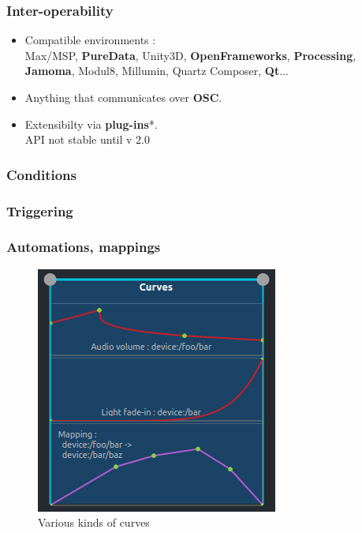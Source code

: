 \documentclass{beamer}
\begin{document}
    \begin{frame}
        \frametitle{Inter-operability}
        \Large
        \begin{itemize}
        	\item Compatible environments :\\
	        	 Max/MSP, \textbf{PureData}, Unity3D, \textbf{OpenFrameworks}, \textbf{Processing}, \textbf{Jamoma}, Modul8, Millumin, Quartz Composer, \textbf{Qt}... 
	        \item Anything that communicates over \textbf{OSC}.
	        \item Extensibilty via \textbf{plug-ins}*. \\ {\small *API not stable until v 2.0}
        \end{itemize}
        
    \end{frame}
    
    
    \begin{frame}
        \frametitle{Conditions}
        \begin{figure}
            \centering{}
        \end{figure}    
    \end{frame}
    
    \begin{frame}
        \frametitle{Triggering}
        \begin{figure}
            \centering{}
        \end{figure}    
    \end{frame}
    
    \begin{frame}
        \frametitle{Automations, mappings}
        \begin{figure}
        	\centering
        	\includegraphics[scale=0.7]{images/curves.png}
        	\caption{Various kinds of curves}
        \end{figure}    
    \end{frame}
    
\end{document}
